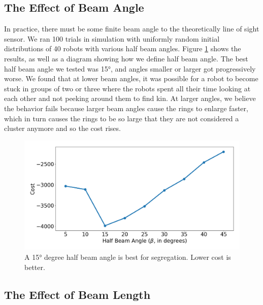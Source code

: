 \documentclass[conference]{IEEEtran}
\begin{document}
  \subsection{The Effect of Beam Angle} \label{section:beam_angle}

    In practice, there must be some finite beam angle to the theoretically line of sight sensor. We ran 100 trials in simulation with uniformly random initial distributions of 40 robots with various half beam angles. Figure \ref{fig:beam_angle} shows the results, as well as a diagram showing how we define half beam angle. The best half beam angle we tested was \ang{15}, and angles smaller or larger got progressively worse. We found that at lower beam angles, it was possible for a robot to become stuck in groups of two or three where the robots spent all their time looking at each other and not peeking around them to find kin. At larger angles, we believe the behavior fails because larger beam angles cause the rings to enlarge faster, which in turn causes the rings to be so large that they are not considered a cluster anymore and so the cost rises.

    \begin{figure}[H]
      \centering
      \includegraphics[width=1\linewidth]{./images/beam_angle.png}
      \caption{A \ang{15} degree half beam angle is best for segregation. Lower cost is better.}
      \label{fig:beam_angle}
    \end{figure}

  \subsection{The Effect of Beam Length} \label{section:beam_length}
\end{document}
